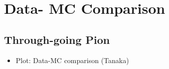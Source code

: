 \section{Data- MC Comparison}
\subsection{Through-going Pion}
\begin{itemize}
\item Plot: Data-MC comparison  (Tanaka)
\end{itemize}







